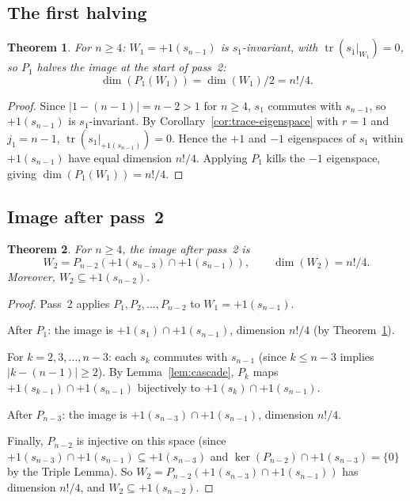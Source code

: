 \documentclass[11pt]{article}
\newtheorem{theorem}{Theorem}
\theoremstyle{definition}
\theoremstyle{remark}
\newcommand{\tr}{\operatorname{tr}}
\begin{document}
\subsection{The first halving}

\begin{theorem}
\label{thm:halving-1}
For $n \ge 4$: $W_1 = +1(s_{n-1})$ is $s_1$-invariant, with
$\tr(s_1|_{W_1}) = 0$, so $P_1$ halves the image at the start
of pass~2:
\[
  \dim(P_1(W_1)) = \dim(W_1)/2 = n!/4.
\]
\end{theorem}

\begin{proof}
Since $|1 - (n-1)| = n-2 > 1$ for $n \ge 4$, $s_1$ commutes with
$s_{n-1}$, so $+1(s_{n-1})$ is $s_1$-invariant. By
Corollary~\ref{cor:trace-eigenspace} with $r = 1$ and $j_1 = n-1$,
$\tr(s_1|_{+1(s_{n-1})}) = 0$. Hence the $+1$ and $-1$ eigenspaces of
$s_1$ within $+1(s_{n-1})$ have equal dimension $n!/4$.
Applying $P_1$ kills the $-1$ eigenspace, giving
$\dim(P_1(W_1)) = n!/4$.
\end{proof}


\subsection{Image after pass~2}

\begin{theorem}
\label{thm:pass2}
For $n \ge 4$, the image after pass~2 is
\[
  W_2 = P_{n-2}\!\left(+1(s_{n-3}) \cap +1(s_{n-1})\right),
  \qquad \dim(W_2) = n!/4.
\]
Moreover, $W_2 \subseteq +1(s_{n-2})$.
\end{theorem}

\begin{proof}
Pass~2 applies $P_1, P_2, \dots, P_{n-2}$ to $W_1 = +1(s_{n-1})$.

After $P_1$: the image is $+1(s_1) \cap +1(s_{n-1})$, dimension $n!/4$
(by Theorem~\ref{thm:halving-1}).

For $k = 2, 3, \dots, n-3$: each $s_k$ commutes with $s_{n-1}$
(since $k \le n-3$ implies $|k - (n-1)| \ge 2$). By
Lemma~\ref{lem:cascade}, $P_k$ maps
$+1(s_{k-1}) \cap +1(s_{n-1})$ bijectively to
$+1(s_k) \cap +1(s_{n-1})$.

After $P_{n-3}$: the image is $+1(s_{n-3}) \cap +1(s_{n-1})$, dimension
$n!/4$.

Finally, $P_{n-2}$ is injective on this space (since
$+1(s_{n-3}) \cap +1(s_{n-1}) \subseteq +1(s_{n-3})$ and
$\ker(P_{n-2}) \cap +1(s_{n-3}) = \{0\}$ by the Triple Lemma).
So $W_2 = P_{n-2}(+1(s_{n-3}) \cap +1(s_{n-1}))$ has dimension $n!/4$,
and $W_2 \subseteq +1(s_{n-2})$.
\end{proof}
\end{document}
